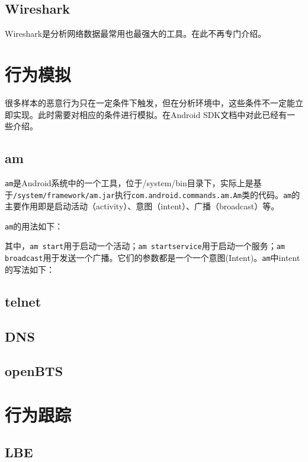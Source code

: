 \subsection{Wireshark}
Wireshark\cite{url:wireshark}是分析网络数据最常用也最强大的工具。在此不再专门介绍。

\section{行为模拟}
很多样本的恶意行为只在一定条件下触发，但在分析环境中，这些条件不一定能立即实现。此时需要对相应的条件进行模拟。在Android SDK文档中对此已经有一些介绍\cite{url:android_using_emulator}。

\subsection{am}
\lstinline!am!是Android系统中的一个工具，位于/system/bin目录下，实际上是基于\lstinline!/system/framework/am.jar!执行\lstinline!com.android.commands.am.Am!类的代码。\lstinline!am!的主要作用即是启动活动（activity）、意图（intent）、广播（broadcast）等。

\lstinline!am!的用法如下：


其中，\lstinline!am start!用于启动一个活动；\lstinline!am startservice!用于启动一个服务；\lstinline!am broadcast!用于发送一个广播。它们的参数都是一个一个意图(Intent)。\lstinline!am!中intent的写法如下：


\subsection{telnet}

\subsection{DNS}

\subsection{openBTS}

\section{行为跟踪}
\subsection{LBE}

